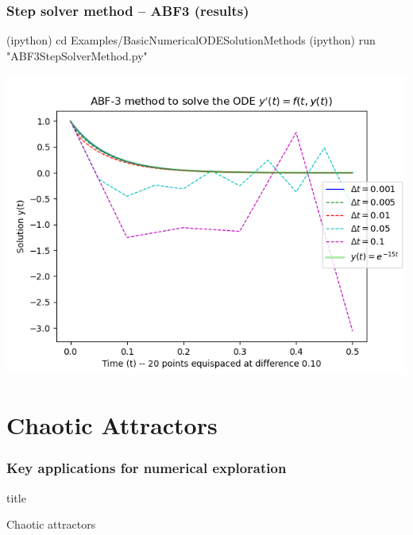 \documentclass[usenames,svgnames,dvipsnames,10pt]{beamer}
\newcommand{\TitleBoxed}[1]{
     \begin{beamercolorbox}[sep=8pt,center,shadow=true,rounded=true]{title}
          \usebeamerfont{title}#1\vskip 0.6cm\par%
     \end{beamercolorbox}
}
\begin{document}
\begin{frame}[fragile]
\frametitle{Step solver method -- ABF3 (results)}

\begin{center}
\begin{code}
(ipython) cd Examples/BasicNumericalODESolutionMethods
(ipython) run "ABF3StepSolverMethod.py"
\end{code}
\vskip -0.205cm
\includegraphics[height=0.76\textheight]{../Images/ABF3MultistepMethodResults-StepSizeHComparison-v2.png}
\end{center}

\end{frame}

\section{Chaotic Attractors} 

\begin{frame}
\frametitle{Key applications for numerical exploration} 

\TitleBoxed{
     \huge{\centerline{Chaotic attractors}}
}

\end{frame}
\end{document}
